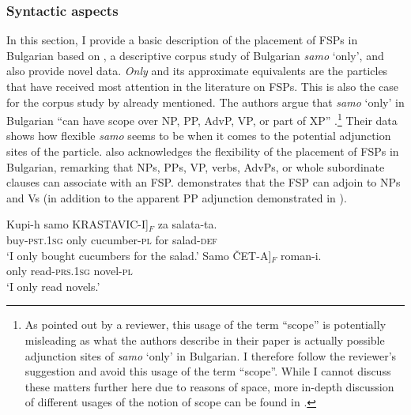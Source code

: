 \documentclass[output=paper,colorlinks,citecolor=brown]{langscibook}
\begin{document}
\subsubsection{Syntactic aspects}\label{sec:2.1.1}
In this section, I provide a basic description of the placement of FSPs in Bulgarian based on \citet{TishevaDzhonova2003}, a descriptive corpus study of Bulgarian \textit{samo} `only', and also provide novel data. 
\textit{Only} and its approximate equivalents are the particles that have received most attention in the literature on FSPs. This is also the case for the corpus study by \citet{TishevaDzhonova2003} already mentioned. The authors argue that \textit{samo} `only' in Bulgarian ``can have scope over NP, PP, AdvP, VP, or part of XP” \citep[65]{TishevaDzhonova2003}.\footnote{As pointed out by a reviewer, this usage of the term ``scope'' is potentially misleading as what the authors describe in their paper is actually possible adjunction sites of \textit{samo} `only' in Bulgarian. I therefore follow the reviewer's suggestion and avoid this usage of the term ``scope''. While I cannot discuss these matters further here due to reasons of space, more in-depth discussion of different usages of the notion of scope can be found in \citet{BrananErlewine2023}.} Their data shows how flexible \textit{samo} seems to be when it comes to the potential adjunction sites of the particle. \citet[109]{Nicolova2000} also acknowledges the flexibility of the placement of FSPs in Bulgarian, remarking that NPs, PPs, VP, verbs, AdvPs, or whole subordinate clauses can associate with an FSP.  demonstrates that the FSP can adjoin to NPs and Vs (in addition to the apparent PP adjunction demonstrated in ). 

\ea\label{Bulgarian:basic3} 
\ea
\gll Kupi-h samo \minsp{[} KRASTAVIC-I]$_{F}$ za salata-ta. \\
buy-\textsc{pst.1sg} only {} cucumber-\textsc{pl} for salad-\textsc{def}\\
\glt ‘I only bought cucumbers for the salad.’
\ex
\gll Samo \minsp{[} \v{C}ET-A]$_{F}$ roman-i. \\
only {} read-\textsc{prs.1sg} novel-\textsc{pl}\\
\glt ‘I only read novels.’\hfill \citep[exx. 7a, 6a]{TishevaDzhonova2003}
\z
\z
\end{document}
